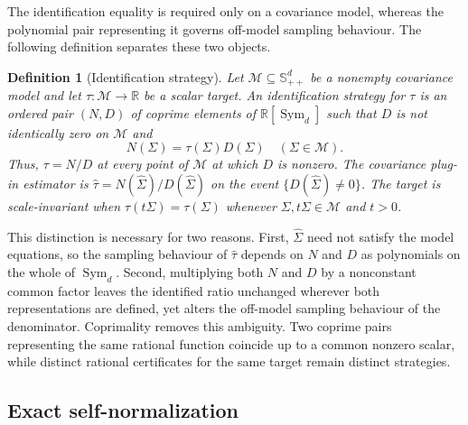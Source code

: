 \documentclass[12pt,a4paper]{article}
\theoremstyle{plain}
\newtheorem{definition}{Definition}
\theoremstyle{definition}
\newcommand{\R}{\mathbb{R}}
\newcommand{\Smat}{\mathbb{S}}
\newcommand{\Sym}{\operatorname{Sym}}
\newcommand{\Sighat}{\hat{\Sigma}}
\begin{document}
The identification equality is required only on a covariance model, whereas the polynomial pair representing it governs off-model sampling behaviour.
The following definition separates these two objects.
\begin{definition}[Identification strategy]
\label{def:strategy}
    Let $\mathcal{M}\subseteq\Smat^d_{++}$ be a nonempty covariance model and let $\tau:\mathcal{M}\to\R$ be a scalar target.
    An identification strategy for $\tau$ is an ordered pair $(N,D)$ of coprime elements of $\R[\Sym_d]$ such that $D$ is not identically zero on $\mathcal{M}$ and
    \begin{equation*}
        N(\Sigma)
        =
        \tau(\Sigma)D(\Sigma)
        \quad
        (\Sigma\in\mathcal{M})
        .
    \end{equation*}
    Thus, $\tau=N/D$ at every point of $\mathcal{M}$ at which $D$ is nonzero.
    The covariance plug-in estimator is $\hat{\tau}=N(\Sighat)/D(\Sighat)$ on the event $\{D(\Sighat)\ne0\}$.
    The target is scale-invariant when $\tau(t\Sigma)=\tau(\Sigma)$ whenever $\Sigma,t\Sigma\in\mathcal{M}$ and $t>0$.
\end{definition}

This distinction is necessary for two reasons.
First, $\Sighat$ need not satisfy the model equations, so the sampling behaviour of $\hat{\tau}$ depends on $N$ and $D$ as polynomials on the whole of $\Sym_d$.
Second, multiplying both $N$ and $D$ by a nonconstant common factor leaves the identified ratio unchanged wherever both representations are defined, yet alters the off-model sampling behaviour of the denominator.
Coprimality removes this ambiguity.
Two coprime pairs representing the same rational function coincide up to a common nonzero scalar, while distinct rational certificates for the same target remain distinct strategies.

\subsection{Exact self-normalization}
\end{document}
